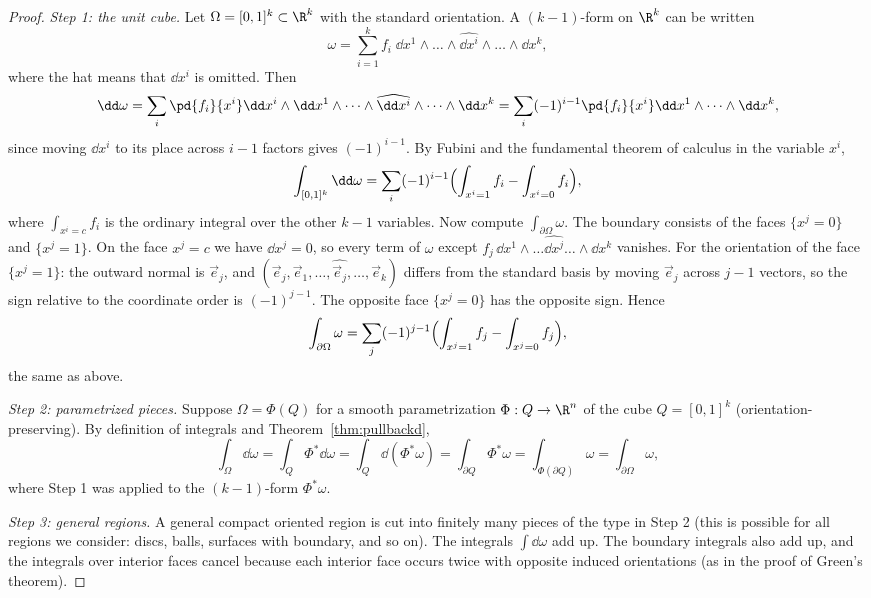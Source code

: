 \begin{proof}
\emph{Step 1: the unit cube.} Let $\Omega=[0,1]^k\subset\R^k$ with the standard orientation. A $(k-1)$-form on $\R^k$ can be written
\[
\omega=\sum_{i=1}^kf_i\;\dd x^1\wedge\dots\wedge\widehat{\dd x^i}\wedge\dots\wedge\dd x^k,
\]
where the hat means that $\dd x^i$ is omitted. Then
\[
\dd\omega=\sum_i\pd{f_i}{x^i}\dd x^i\wedge\dd x^1\wedge\dots\wedge\widehat{\dd x^i}\wedge\dots\wedge\dd x^k=\sum_i(-1)^{i-1}\pd{f_i}{x^i}\dd x^1\wedge\dots\wedge\dd x^k,
\]
since moving $\dd x^i$ to its place across $i-1$ factors gives $(-1)^{i-1}$. By Fubini and the fundamental theorem of calculus in the variable $x^i$,
\[
\int_{[0,1]^k}\dd\omega=\sum_i(-1)^{i-1}\Bigl(\int_{x^i=1}f_i-\int_{x^i=0}f_i\Bigr),
\]
where $\int_{x^i=c}f_i$ is the ordinary integral over the other $k-1$ variables. Now compute $\int_{\partial\Omega}\omega$. The boundary consists of the faces $\{x^j=0\}$ and $\{x^j=1\}$. On the face $x^j=c$ we have $\dd x^j=0$, so every term of $\omega$ except $f_j\,\dd x^1\wedge\dots\widehat{\dd x^j}\dots\wedge\dd x^k$ vanishes. For the orientation of the face $\{x^j=1\}$: the outward normal is $\vec e_j$, and $(\vec e_j,\vec e_1,\dots,\widehat{\vec e_j},\dots,\vec e_k)$ differs from the standard basis by moving $\vec e_j$ across $j-1$ vectors, so the sign relative to the coordinate order is $(-1)^{j-1}$. The opposite face $\{x^j=0\}$ has the opposite sign. Hence
\[
\int_{\partial\Omega}\omega=\sum_j(-1)^{j-1}\Bigl(\int_{x^j=1}f_j-\int_{x^j=0}f_j\Bigr),
\]
the same as above.

\emph{Step 2: parametrized pieces.} Suppose $\Omega=\Phi(Q)$ for a smooth parametrization $\Phi:Q\to\R^n$ of the cube $Q=[0,1]^k$ (orientation-preserving). By definition of integrals and Theorem~\ref{thm:pullbackd},
\[
\int_\Omega\dd\omega=\int_Q\Phi^*\dd\omega=\int_Q\dd(\Phi^*\omega)=\int_{\partial Q}\Phi^*\omega=\int_{\Phi(\partial Q)}\omega=\int_{\partial\Omega}\omega,
\]
where Step 1 was applied to the $(k-1)$-form $\Phi^*\omega$.

\emph{Step 3: general regions.} A general compact oriented region is cut into finitely many pieces of the type in Step 2 (this is possible for all regions we consider: discs, balls, surfaces with boundary, and so on). The integrals $\int\dd\omega$ add up. The boundary integrals also add up, and the integrals over interior faces cancel because each interior face occurs twice with opposite induced orientations (as in the proof of Green's theorem).
\end{proof}

